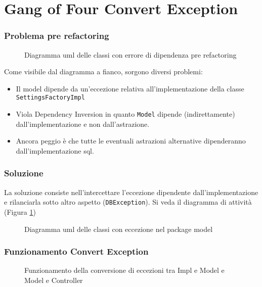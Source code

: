 \section{Gang of Four Convert Exception}
\begin{frame}
    \frametitle{Problema pre refactoring}

    \begin{minipage}{.40\textwidth}
        \begin{figure}
            \centering
            \caption{Diagramma uml delle classi con errore di dipendenza pre refactoring}
        \end{figure}
    \end{minipage}\hfill
    \begin{minipage}{.58\textwidth}
        Come visibile dal diagramma a fianco, sorgono diversi problemi:
        \begin{itemize}
            \item Il model dipende da un'eccezione relativa all'implementazione della classe \texttt{SettingsFactoryImpl}
            \item Viola Dependency Inversion in quanto \texttt{Model} dipende (indirettamente) dall'implementazione e non dall'astrazione.
            \item Ancora peggio è che tutte le eventuali astrazioni alternative dipenderanno dall'implementazione sql.
        \end{itemize}
    \end{minipage}
\end{frame}

\begin{frame}
    \frametitle{Soluzione}

    \begin{minipage}{.40\textwidth}
        La soluzione consiste nell'intercettare l'eccezione dipendente dall'implementazione e rilanciarla sotto altro aspetto (\texttt{DBException}). Si veda il diagramma di attività (Figura \ref{uml:act:convex})
    \end{minipage}\hfill
    \begin{minipage}{.58\textwidth}
        \begin{figure}
            \centering
            \caption{Diagramma uml delle classi con eccezione nel package model}
        \end{figure}
    \end{minipage}
\end{frame}

\begin{frame}
    \frametitle{Funzionamento Convert Exception}
    \begin{figure}
        \centering
        \label{uml:act:convex}\caption{Funzionamento della conversione di eccezioni tra Impl e Model e Model e Controller}
    \end{figure}
\end{frame}
